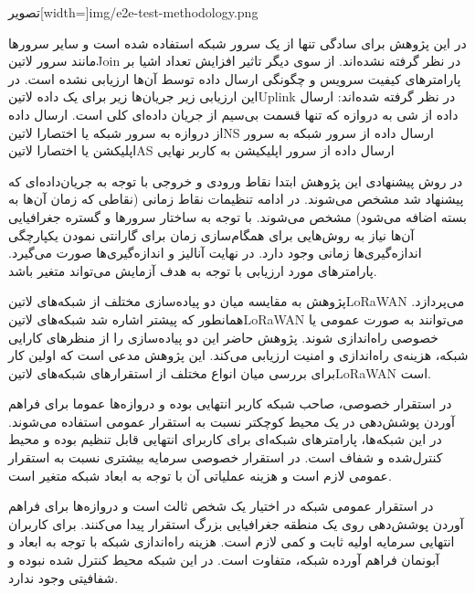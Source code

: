 ‌تصویر[width=\textwidth]{img/e2e-test-methodology.png}

در این پژوهش برای سادگی تنها از یک سرور شبکه استفاده شده است و سایر سرورها مانند سرور ‌لاتین{Join} در نظر گرفته نشده‌اند.
از سوی دیگر تاثیر افزایش تعداد اشیا بر پارامترهای کیفیت سرویس و چگونگی ارسال داده توسط آن‌ها ارزیابی نشده است.
در این ارزیابی زیر جریان‌ها زیر برای یک داده ‌لاتین{Uplink} در نظر گرفته شده‌اند:
 ارسال داده از شی به دروازه که تنها قسمت بی‌سیم از جریان داده‌ای کلی است.
 ارسال داده از دروازه به سرور شبکه یا اختصارا ‌لاتین{NS}
 ارسال داده از سرور شبکه به سرور اپلیکشن یا اختصارا ‌لاتین{AS}
 ارسال داده از سرور اپلیکیشن به کاربر نهایی

در روش پیشنهادی این پژوهش ابتدا نقاط ورودی و خروجی با توجه به جریان‌داده‌ای که پیشنهاد شد مشخص می‌شوند.
در ادامه تنظیمات نقاط زمانی (نقاطی که زمان آن‌ها به بسته اضافه می‌شود) مشخص می‌شوند.
با توجه به ساختار سرور‌ها و گستره جغرافیایی آن‌ها نیاز به روش‌هایی برای همگام‌سازی زمان برای گارانتی نمودن
یکپارچگی اندازه‌گیری‌ها زمانی وجود دارد.
در نهایت آنالیز و اندازه‌گیری‌ها صورت می‌گیرد. پارامترهای مورد ارزیابی با توجه به هدف آزمایش می‌تواند متغیر باشد.


پژوهش  به مقایسه میان دو پیاده‌سازی مختلف از شبکه‌های ‌لاتین{LoRaWAN} می‌پردازد. همانطور که پیشتر اشاره شد شبکه‌های ‌لاتین{LoRaWAN} می‌توانند به صورت عمومی یا خصوصی
راه‌اندازی شوند. پژوهش حاضر این دو پیاده‌سازی را از منظرهای کارایی شبکه، هزینه‌ی راه‌اندازی و امنیت ارزیابی می‌کند. این پژوهش مدعی است که اولین کار برای بررسی میان انواع مختلف از استقرارهای شبکه‌های ‌لاتین{LoRaWAN}
است.

در استقرار خصوصی، صاحب شبکه کاربر انتهایی بوده و دروازه‌ها عموما برای فراهم آوردن پوشش‌دهی در یک محیط کوچکتر نسبت به استقرار عمومی استفاده می‌شوند.
در این شبکه‌ها، پارامترهای شبکه‌ای برای کاربرای انتهایی قابل تنظیم بوده و محیط کنترل‌شده و شفاف است. در استقرار خصوصی سرمایه بیشتری نسبت به استقرار عمومی لازم است و هزینه
عملیاتی آن با توجه به ابعاد شبکه متغیر است.

در استقرار عمومی شبکه در اختیار یک شخص ثالث است و دروازه‌ها برای فراهم آوردن پوشش‌دهی روی یک منطقه جغرافیایی بزرگ استقرار پیدا می‌کنند.
برای کاربران انتهایی سرمایه اولیه ثابت و کمی لازم است. هزینه راه‌اندازی شبکه با توجه به ابعاد و آبونمان فراهم آورده شبکه، متفاوت است.
در این شبکه محیط کنترل شده نبوده و شفافیتی وجود ندارد.

